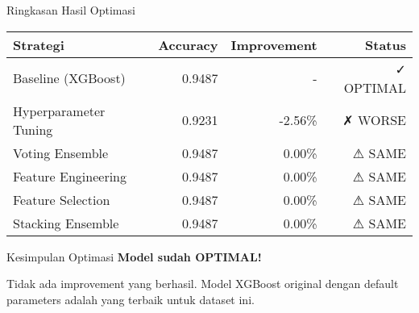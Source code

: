 \documentclass[aspectratio=169]{beamer}
\begin{document}
\begin{frame}{Ringkasan Hasil Optimasi}
\begin{table}
\centering
\begin{tabular}{lrrr}
\toprule
\textbf{Strategi} & \textbf{Accuracy} & \textbf{Improvement} & \textbf{Status} \\
\midrule
\rowcolor{lightblue!20}
Baseline (XGBoost) & 0.9487 & - & ✓ OPTIMAL \\
Hyperparameter Tuning & 0.9231 & -2.56\% & ✗ WORSE \\
Voting Ensemble & 0.9487 & 0.00\% & ⚠ SAME \\
Feature Engineering & 0.9487 & 0.00\% & ⚠ SAME \\
Feature Selection & 0.9487 & 0.00\% & ⚠ SAME \\
Stacking Ensemble & 0.9487 & 0.00\% & ⚠ SAME \\
\bottomrule
\end{tabular}
\end{table}

\vspace{0.5cm}
\begin{alertblock}{Kesimpulan Optimasi}
\Large
\textbf{Model sudah OPTIMAL!}

\normalsize
Tidak ada improvement yang berhasil. Model XGBoost original dengan default parameters adalah yang terbaik untuk dataset ini.
\end{alertblock}
\end{frame}
\end{document}

